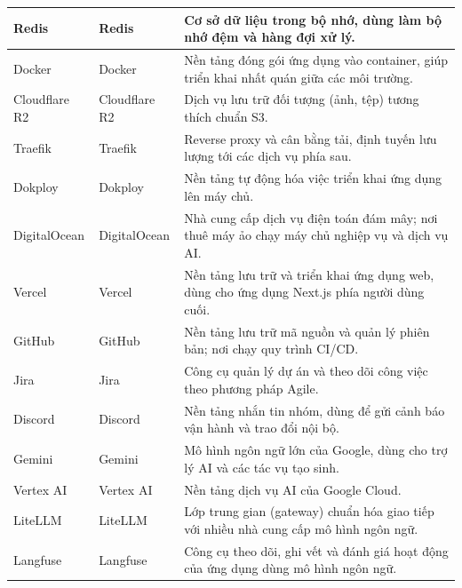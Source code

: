 \begin{longtable}{|L{0.18\textwidth}|L{0.27\textwidth}|L{0.49\textwidth}|}
Redis & Redis & Cơ sở dữ liệu trong bộ nhớ, dùng làm bộ nhớ đệm và hàng đợi xử lý. \\
\hline

Docker & Docker & Nền tảng đóng gói ứng dụng vào container, giúp triển khai nhất quán giữa các môi trường. \\
\hline

Cloudflare R2 & Cloudflare R2 & Dịch vụ lưu trữ đối tượng (ảnh, tệp) tương thích chuẩn S3. \\
\hline

Traefik & Traefik & Reverse proxy và cân bằng tải, định tuyến lưu lượng tới các dịch vụ phía sau. \\
\hline

Dokploy & Dokploy & Nền tảng tự động hóa việc triển khai ứng dụng lên máy chủ. \\
\hline

DigitalOcean & DigitalOcean & Nhà cung cấp dịch vụ điện toán đám mây; nơi thuê máy ảo chạy máy chủ nghiệp vụ và dịch vụ AI. \\
\hline

Vercel & Vercel & Nền tảng lưu trữ và triển khai ứng dụng web, dùng cho ứng dụng Next.js phía người dùng cuối. \\
\hline

GitHub & GitHub & Nền tảng lưu trữ mã nguồn và quản lý phiên bản; nơi chạy quy trình CI/CD. \\
\hline

Jira & Jira & Công cụ quản lý dự án và theo dõi công việc theo phương pháp Agile. \\
\hline

Discord & Discord & Nền tảng nhắn tin nhóm, dùng để gửi cảnh báo vận hành và trao đổi nội bộ. \\
\hline

Gemini & Gemini & Mô hình ngôn ngữ lớn của Google, dùng cho trợ lý AI và các tác vụ tạo sinh. \\
\hline

Vertex AI & Vertex AI & Nền tảng dịch vụ AI của Google Cloud. \\
\hline

LiteLLM & LiteLLM & Lớp trung gian (gateway) chuẩn hóa giao tiếp với nhiều nhà cung cấp mô hình ngôn ngữ. \\
\hline

Langfuse & Langfuse & Công cụ theo dõi, ghi vết và đánh giá hoạt động của ứng dụng dùng mô hình ngôn ngữ. \\
\hline


\end{longtable}
